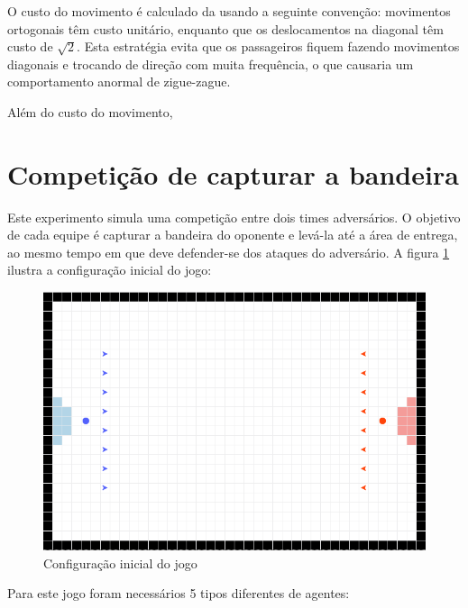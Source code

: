 \documentclass[preprint,12pt]{elsarticle}
\begin{document}
O custo do movimento é calculado da usando a seguinte convenção: movimentos ortogonais têm custo unitário, enquanto que os deslocamentos na diagonal têm custo de $\sqrt{2}$. Esta estratégia evita que os passageiros fiquem fazendo movimentos diagonais e trocando de direção com muita frequência, o que causaria um comportamento anormal de zigue-zague.

Além do custo do movimento, 

\section{Competição de capturar a bandeira}
\label{sec:sim2}

Este experimento simula uma competição entre dois times adversários. O objetivo de cada equipe é capturar a bandeira do oponente e levá-la até a área de entrega, ao mesmo tempo em que deve defender-se dos ataques do adversário. A figura \ref{fig:flag-ini} ilustra a configuração inicial do jogo:

\begin{figure}[H]
	\centering
	\includegraphics[totalheight=5cm]{figures/flag-ini.png}
	\caption{Configuração inicial do jogo}
	\label{fig:flag-ini}
\end{figure}

Para este jogo foram necessários 5 tipos diferentes de agentes:
\end{document}

